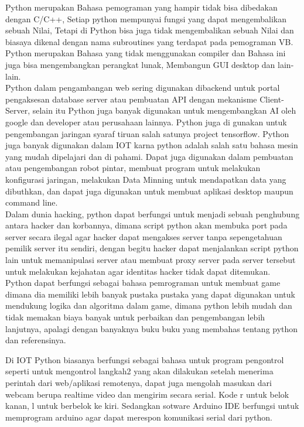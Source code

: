 \documentclass[12pt,a4paper]{article}
\begin{document}
Python merupakan Bahasa pemograman yang hampir tidak bisa dibedakan dengan C/C++, Setiap python mempunyai fungsi yang dapat mengembalikan sebuah Nilai, Tetapi di Python  bisa juga  tidak mengembalikan sebuah Nilai dan biasaya dikenal dengan nama subroutines yang terdapat pada pemograman VB. Python merupakan Bahasa yang tidak menggunakan compiler dan Bahasa ini juga bisa mengembangkan perangkat lunak, Membangun GUI desktop dan lain-lain.\\

Python dalam pengambangan web sering digunakan dibackend untuk portal pengaksesan database server atau pembuatan API dengan mekanisme Client-Server, selain itu Python juga banyak digunakan untuk mengembangkan AI oleh google dan developer atau perusahaan lainnya. Python juga di gunakan untuk pengembangan jaringan syaraf tiruan salah satunya project tensorflow. Python juga banyak digunakan dalam IOT karna python adalah salah satu bahasa mesin yang mudah dipelajari dan di pahami. Dapat juga digunakan dalam pembuatan atau pengembangan robot pintar, membuat program untuk melakukan konfigurasi jaringan, melakukan Data Minning untuk mendapatkan data yang dibuthkan, dan dapat juga digunakan untuk membuat aplikasi desktop maupun command line.\\

Dalam dunia hacking, python dapat berfungsi untuk menjadi sebuah penghubung antara hacker dan korbannya, dimana script python akan membuka port pada server secara ilegal agar hacker dapat mengakses server tanpa sepengetahuan pemilik server itu sendiri, dengan begitu hacker dapat menjalankan script python lain untuk memanipulasi server atau membuat proxy server pada server tersebut untuk melakukan kejahatan agar identitas hacker tidak dapat ditemukan.\\

Python dapat berfungsi sebagai bahasa pemrograman untuk membuat game dimana dia memiliki lebih banyak pustaka pustaka yang dapat digunakan untuk mendukung logika dan algoritma dalam game, dimana python lebih mudah dan tidak memakan biaya banyak untuk perbaikan dan pengembangan lebih lanjutnya, apalagi dengan banyaknya buku buku yang membahas tentang python dan referensinya.

Di IOT Python biasanya berfungsi sebagai bahasa untuk program pengontrol seperti untuk mengontrol langkah2 yang akan dilakukan setelah menerima perintah dari web/aplikasi remotenya, dapat juga mengolah  masukan  dari  webcam  berupa  realtime  video  dan   mengirim secara serial. Kode r untuk belok kanan, l untuk berbelok ke kiri. Sedangkan sotware Arduino  IDE berfungsi untuk memprogram arduino agar dapat merespon komunikasi serial  dari python.\\
\end{document}
